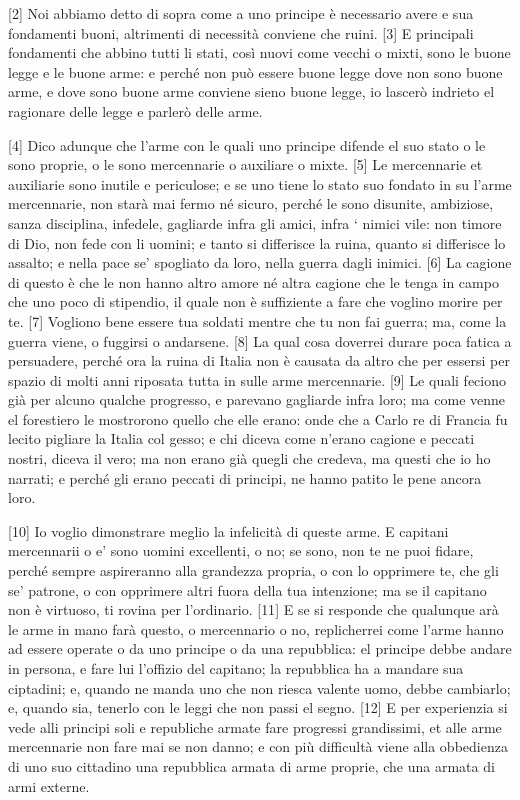 {[}2{]} Noi abbiamo detto di sopra come a uno principe è necessario
avere e sua fondamenti buoni, altrimenti di necessità conviene che
ruini. {[}3{]} E principali fondamenti che abbino tutti li stati, così
nuovi come vecchi o mixti, sono le buone legge e le buone arme: e perché
non può essere buone legge dove non sono buone arme, e dove sono buone
arme conviene sieno buone legge, io lascerò indrieto el ragionare delle
legge e parlerò delle arme.

{[}4{]} Dico adunque che l'arme con le quali uno principe difende el suo
stato o le sono proprie, o le sono mercennarie o auxiliare o mixte.
{[}5{]} Le mercennarie et auxiliarie sono inutile e periculose; e se uno
tiene lo stato suo fondato in su l'arme mercennarie, non starà mai fermo
né sicuro, perché le sono disunite, ambiziose, sanza disciplina,
infedele, gagliarde infra gli amici, infra ` nimici vile: non timore di
Dio, non fede con li uomini; e tanto si differisce la ruina, quanto si
differisce lo assalto; e nella pace se' spogliato da loro, nella guerra
dagli inimici. {[}6{]} La cagione di questo è che le non hanno altro
amore né altra cagione che le tenga in campo che uno poco di stipendio,
il quale non è suffiziente a fare che voglino morire per te. {[}7{]}
Vogliono bene essere tua soldati mentre che tu non fai guerra; ma, come
la guerra viene, o fuggirsi o andarsene. {[}8{]} La qual cosa doverrei
durare poca fatica a persuadere, perché ora la ruina di Italia non è
causata da altro che per essersi per spazio di molti anni riposata tutta
in sulle arme mercennarie. {[}9{]} Le quali feciono già per alcuno
qualche progresso, e parevano gagliarde infra loro; ma come venne el
forestiero le mostrorono quello che elle erano: onde che a Carlo re di
Francia fu lecito pigliare la Italia col gesso; e chi diceva come
n'erano cagione e peccati nostri, diceva il vero; ma non erano già
quegli che credeva, ma questi che io ho narrati; e perché gli erano
peccati di principi, ne hanno patito le pene ancora loro.

{[}10{]} Io voglio dimonstrare meglio la infelicità di queste arme. E
capitani mercennarii o e' sono uomini excellenti, o no; se sono, non te
ne puoi fidare, perché sempre aspireranno alla grandezza propria, o con
lo opprimere te, che gli se' patrone, o con opprimere altri fuora della
tua intenzione; ma se il capitano non è virtuoso, ti rovina per
l'ordinario. {[}11{]} E se si responde che qualunque arà le arme in mano
farà questo, o mercennario o no, replicherrei come l'arme hanno ad
essere operate o da uno principe o da una repubblica: el principe debbe
andare in persona, e fare lui l'offizio del capitano; la repubblica ha a
mandare sua ciptadini; e, quando ne manda uno che non riesca valente
uomo, debbe cambiarlo; e, quando sia, tenerlo con le leggi che non passi
el segno. {[}12{]} E per experienzia si vede alli principi soli e
republiche armate fare progressi grandissimi, et alle arme mercennarie
non fare mai se non danno; e con più difficultà viene alla obbedienza di
uno suo cittadino una repubblica armata di arme proprie, che una armata
di armi externe.

